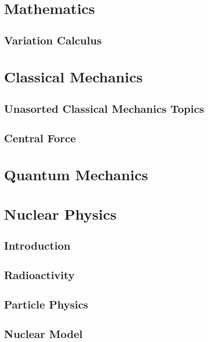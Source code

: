 \documentclass[10pt]{report}
\begin{document}
\chapter*{Mathematics}
\pagestyle{empty}



\section*{Variation Calculus}
\clearpage
\clearpage

\chapter*{Classical Mechanics}
\section*{Unasorted Classical Mechanics Topics}
\clearpage

\section*{Central Force}
\clearpage

\chapter*{Quantum Mechanics}
\clearpage
\clearpage

\chapter*{Nuclear Physics}
\section*{Introduction}
\clearpage

\section*{Radioactivity}
\clearpage

\section*{Particle Physics}
\clearpage

\section*{Nuclear Model}

\end{document}
